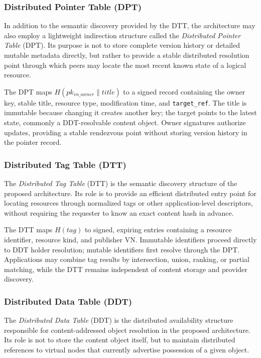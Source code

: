 \documentclass[
  12pt,
  oneside,
  a4paper,
  chapter=TITLE,
  section=TITLE,
  english,
  brazil
]{abntex2}
\begin{document}
\subsubsection{Distributed Pointer Table (DPT)}

In addition to the semantic discovery provided by the DTT, the architecture may also employ a lightweight indirection structure called the \textit{Distributed Pointer Table} (DPT). Its purpose is not to store complete version history or detailed mutable metadata directly, but rather to provide a stable distributed resolution point through which peers may locate the most recent known state of a logical resource.

The DPT maps $H(pk_{vn\_owner} \parallel title)$ to a signed record containing the owner key, stable title, resource type, modification time, and \texttt{target\_ref}. The title is immutable because changing it creates another key; the target points to the latest state, commonly a DDT-resolvable content object. Owner signatures authorize updates, providing a stable rendezvous point without storing version history in the pointer record.


\subsubsection{Distributed Tag Table (DTT)}

The \textit{Distributed Tag Table} (DTT) is the semantic discovery structure of the proposed architecture. Its role is to provide an efficient distributed entry point for locating resources through normalized tags or other application-level descriptors, without requiring the requester to know an exact content hash in advance.

The DTT maps $H(tag)$ to signed, expiring entries containing a resource identifier, resource kind, and publisher VN. Immutable identifiers proceed directly to DDT holder resolution; mutable identifiers first resolve through the DPT. Applications may combine tag results by intersection, union, ranking, or partial matching, while the DTT remains independent of content storage and provider discovery.

\subsubsection{Distributed Data Table (DDT)}

The \textit{Distributed Data Table} (DDT) is the distributed availability structure responsible for content-addressed object resolution in the proposed architecture. Its role is not to store the content object itself, but to maintain distributed references to virtual nodes that currently advertise possession of a given object.
\end{document}
